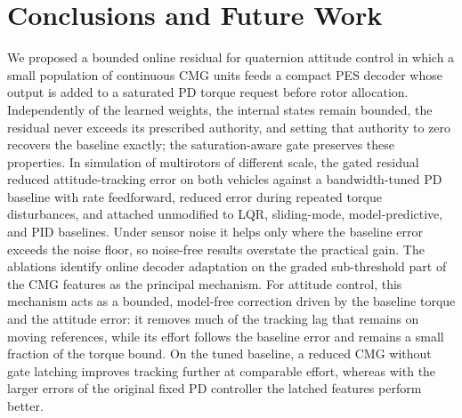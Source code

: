 \documentclass[letterpaper, 10 pt, conference]{ieeeconf}
\begin{document}


\section{Conclusions and Future Work}
\label{sec:conclusion}

We proposed a bounded online residual for quaternion attitude control in which a small population of continuous CMG units feeds a compact PES decoder whose output is added to a saturated PD torque request before rotor allocation. Independently of the learned weights, the internal states remain bounded, the residual never exceeds its prescribed authority, and setting that authority to zero recovers the baseline exactly; the saturation-aware gate preserves these properties. In simulation of multirotors of different scale, the gated residual reduced attitude-tracking error on both vehicles against a bandwidth-tuned PD baseline with rate feedforward, reduced error during repeated torque disturbances, and attached unmodified to LQR, sliding-mode, model-predictive, and PID baselines. Under sensor noise it helps only where the baseline error exceeds the noise floor, so noise-free results overstate the practical gain. The ablations identify online decoder adaptation on the graded sub-threshold part of the CMG features as the principal mechanism. For attitude control, this mechanism acts as a bounded, model-free correction driven by the baseline torque and the attitude error: it removes much of the tracking lag that remains on moving references, while its effort follows the baseline error and remains a small fraction of the torque bound. On the tuned baseline, a reduced CMG without gate latching improves tracking further at comparable effort, whereas with the larger errors of the original fixed PD controller the latched features perform better.
\end{document}
